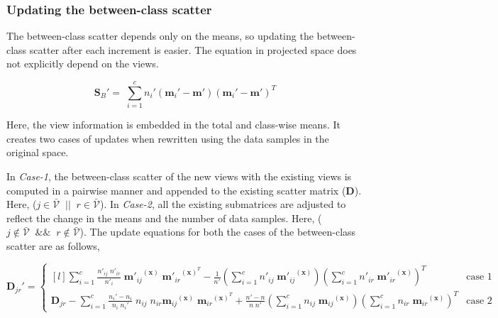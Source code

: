 \subsubsection{Updating the between-class scatter}
\label{ssubs:VIDMvDA_Inc_Sb}
The between-class scatter depends only on the means, so updating the between-class scatter after each increment is easier. The equation in projected space does not explicitly depend on the views.

\begin{equation}
\label{eqn:VIDMvDA_Add_Sb}
\textbf{S}_B' = \; \sum_{i=1}^{c} n_{i}' (\textbf{m}_{i}' - \textbf{m}') (\textbf{m}_{i}' - \textbf{m}')^T
\end{equation}

Here, the view information is embedded in the total and class-wise means. It creates two cases of updates when rewritten using the data samples in the original space.

In \textit{Case-1}, the between-class scatter of the new views with the existing views is computed in a pairwise manner and appended to the existing scatter matrix ($\textbf{D}$). Here, ($ j \in \bar{\mathcal{V}} \;\; || \;\; r \in \bar{\mathcal{V}}$). In \textit{Case-2}, all the existing submatrices are adjusted to reflect the change in the means and the number of data samples. Here, ($ j \notin \bar{\mathcal{V}} \;\; \&\& \;\; r \notin \bar{\mathcal{V}}$). The update equations for both the cases of the between-class scatter are as follows,


\begin{equation}
\label{eqn:VIDMvDA_Add_Djr}
\textbf{D}_{jr}' = \left\{\begin{matrix*}[l]
\sum\limits_{i=1}^{c} \frac{n'_{ij} \; n'_{ir}}{n'_i} \; {\textbf{m}'_{ij}}^{(\textbf{x})} \; {\textbf{m}'_{ir}}^{(\textbf{x})^T} - \frac{1}{n'} \left ( \sum\limits_{i=1}^{c} n'_{ij} \; {\textbf{m}'_{ij}}^{(\textbf{x})} \right )\left ( \sum\limits_{i=1}^{c} n'_{ir} \; {\textbf{m}'_{ir}}^{(\textbf{x})} \right )^T & \text{case 1}
\\
\textbf{D}_{jr} - \sum\limits_{i=1}^{c} \frac{n_i' - n_i}{n_i \; n_i'} \; n_{ij} \; n_{ir} {\textbf{m}_{ij}}^{(\textbf{x})} \; {\textbf{m}_{ir}}^{(\textbf{x})^T} + \frac{n' - n}{n \; n'} \left ( \sum\limits_{i=1}^{c} n_{ij} \; {\textbf{m}_{ij}}^{(\textbf{x})} \right )\left ( \sum\limits_{i=1}^{c} n_{ir} \; {\textbf{m}_{ir}}^{(\textbf{x})} \right )^T & \text{case 2}
\end{matrix*}\right.
\end{equation}


